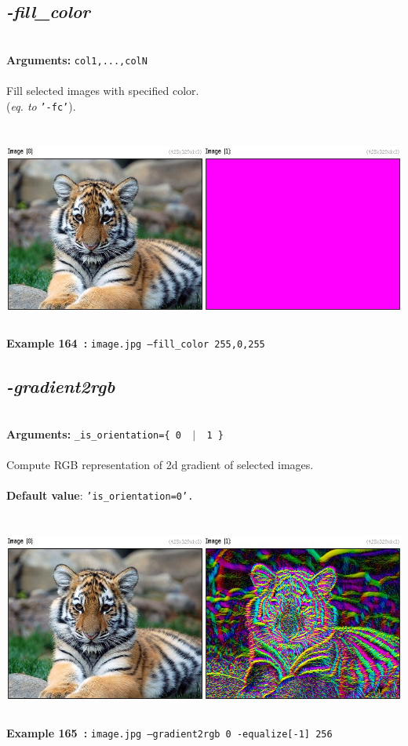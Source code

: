 \documentclass[a4paper,11pt,twoside]{book}
\begin{document}
\subsection{\emph{-fill\_color} }\vspace*{-0.5em}
~\\\textbf{Arguments: } 
{\small \texttt{col1,...,colN}}\\~\\
Fill selected images with specified color.
~\\(\emph{eq. to} {\small \texttt{'-fc'}}).
\begin{center}\includegraphics[keepaspectratio=true,height=7cm,width=\textwidth]{img/gmic_def164.jpg}\\
{\footnotesize \textbf{Example 164~:} \texttt{image.jpg --fill\_color 255,0,255}}
\end{center}

\subsection{\emph{-gradient2rgb} }\vspace*{-0.5em}
~\\\textbf{Arguments: } 
{\small \texttt{\_is\_orientation=\{ 0 ~$|$~ 1 \}}}\\~\\
Compute RGB representation of 2d gradient of selected images.
~\\~\\\textbf{Default value}: {\small \texttt{'is\_orientation=0'.}}
\begin{center}\includegraphics[keepaspectratio=true,height=7cm,width=\textwidth]{img/gmic_def165.jpg}\\
{\footnotesize \textbf{Example 165~:} \texttt{image.jpg --gradient2rgb 0 -equalize[-1] 256}}
\end{center}
\end{document}
